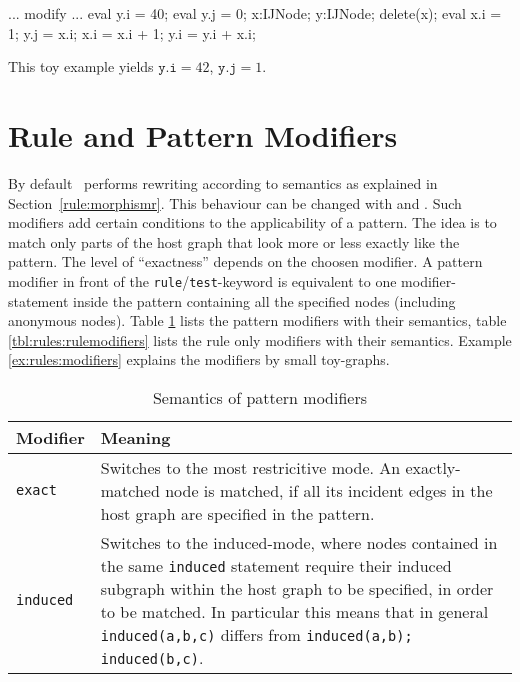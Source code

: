\begin{example}
\begin{grgen}
...
modify {
  ...
  eval { y.i = 40; }
  eval { y.j = 0;  }
  x:IJNode;
  y:IJNode;
  delete(x);
  eval {
    x.i = 1; 
    y.j = x.i;
    x.i = x.i + 1;
    y.i = y.i + x.i;
  }
}
\end{grgen}
This toy example yields $\texttt{y.i} = 42$, $\texttt{y.j} = 1$.
\end{example}


\section{Rule and Pattern Modifiers} 
\label{sct:patternmodifier}
By default \GrG\ performs rewriting according to  semantics as explained in Section~\ref{rule:morphismr}.
This behaviour can be changed with  and .
Such modifiers add certain conditions to the applicability of a pattern.
The idea is to match only parts of the host graph that look more or less exactly like the pattern.
The level of ``exactness'' depends on the choosen modifier.
A pattern modifier in front of the \texttt{rule}/\texttt{test}-keyword is equivalent to one modifier-statement inside the pattern containing all the specified nodes (including anonymous nodes).
Table \ref{tbl:rules:patternmodifiers} lists the pattern modifiers with their semantics, table \ref{tbl:rules:rulemodifiers} lists the rule only modifiers with their semantics.
Example \ref{ex:rules:modifiers} explains the modifiers by small toy-graphs.

\begin{table}[htbp]
    \begin{tabularx}{\linewidth}{l|X}
        \bf Modifier & \bf Meaning \\\hline
        \texttt{exact} & Switches to the most restricitive mode. An exactly-matched node is matched, if all its incident edges in the host graph are specified in the pattern.\\
        \texttt{induced} & Switches to the induced-mode, where nodes contained in the same \texttt{induced} statement require their induced subgraph within the host graph to be specified, in order to be matched. In particular this means that in general \texttt{induced(a,b,c)} differs from \texttt{induced(a,b); induced(b,c)}.\\
    \end{tabularx}    
    \caption{Semantics of pattern modifiers}
    \label{tbl:rules:patternmodifiers}
\end{table}

